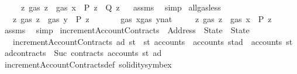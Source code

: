 \begin{isabellebody}
\ \ \ \ \ {\isachardoublequoteopen}{\isasymforall}z{\isachardot}{\kern0pt}\ gas\ z\ {\isasymle}\ gas\ x\ {\isasymand}\ P\ z\ {\isasymlongrightarrow}\ Q\ z{\isachardoublequoteclose}%
\isadelimproof
\ %
\endisadelimproof
%
\isatagproof
{}\isamarkupfalse%
\ assms\ \isamarkupfalse%
\ simp%
\endisatagproof
{\isafoldproof}%
%
\isadelimproof
%
\endisadelimproof
\isanewline
\isanewline
{}\isamarkupfalse%
\ all{\isacharunderscore}{\kern0pt}gas{\isacharunderscore}{\kern0pt}less{\isacharcolon}{\kern0pt}\isanewline
\ \ \ {\isachardoublequoteopen}{\isasymforall}z{\isachardot}{\kern0pt}\ gas\ z\ {\isacharless}{\kern0pt}\ gas\ y\ {\isasymlongrightarrow}\ P\ z{\isachardoublequoteclose}\isanewline
\ \ \ \ \ \ \ {\isachardoublequoteopen}gas\ x{\isasymle}{\isacharparenleft}{\kern0pt}gas\ y{\isacharcolon}{\kern0pt}{\isacharcolon}{\kern0pt}nat{\isacharparenright}{\kern0pt}{\isachardoublequoteclose}\isanewline
\ \ \ \ \ {\isachardoublequoteopen}{\isasymforall}z{\isachardot}{\kern0pt}\ gas\ z\ {\isacharless}{\kern0pt}\ gas\ x\ {\isasymlongrightarrow}\ P\ z{\isachardoublequoteclose}%
\isadelimproof
\ %
\endisadelimproof
%
\isatagproof
{}\isamarkupfalse%
\ assms\ \isamarkupfalse%
\ simp%
\endisatagproof
{\isafoldproof}%
%
\isadelimproof
%
\endisadelimproof
\isanewline
\isanewline
{}\isamarkupfalse%
\ incrementAccountContracts\ {\isacharcolon}{\kern0pt}{\isacharcolon}{\kern0pt}\ {\isachardoublequoteopen}Address\ {\isasymRightarrow}\ State\ {\isasymRightarrow}\ State{\isachardoublequoteclose}\isanewline
\ \ \ {\isachardoublequoteopen}incrementAccountContracts\ ad\ st\ {\isacharequal}{\kern0pt}\ st\ {\isasymlparr}accounts\ {\isacharcolon}{\kern0pt}{\isacharequal}{\kern0pt}\ {\isacharparenleft}{\kern0pt}accounts\ st{\isacharparenright}{\kern0pt}{\isacharparenleft}{\kern0pt}ad\ {\isacharcolon}{\kern0pt}{\isacharequal}{\kern0pt}\ {\isacharparenleft}{\kern0pt}accounts\ st\ ad{\isacharparenright}{\kern0pt}{\isasymlparr}contracts\ {\isacharcolon}{\kern0pt}{\isacharequal}{\kern0pt}\ Suc\ {\isacharparenleft}{\kern0pt}contracts\ {\isacharparenleft}{\kern0pt}accounts\ st\ ad{\isacharparenright}{\kern0pt}{\isacharparenright}{\kern0pt}{\isasymrparr}{\isacharparenright}{\kern0pt}{\isasymrparr}{\isachardoublequoteclose}\isanewline
\isanewline
{}\isamarkupfalse%
\ incrementAccountContracts{\isacharunderscore}{\kern0pt}def\ {\isacharbrackleft}{\kern0pt}solidity{\isacharunderscore}{\kern0pt}symbex{\isacharbrackright}{\kern0pt}\isanewline

\end{isabellebody}
